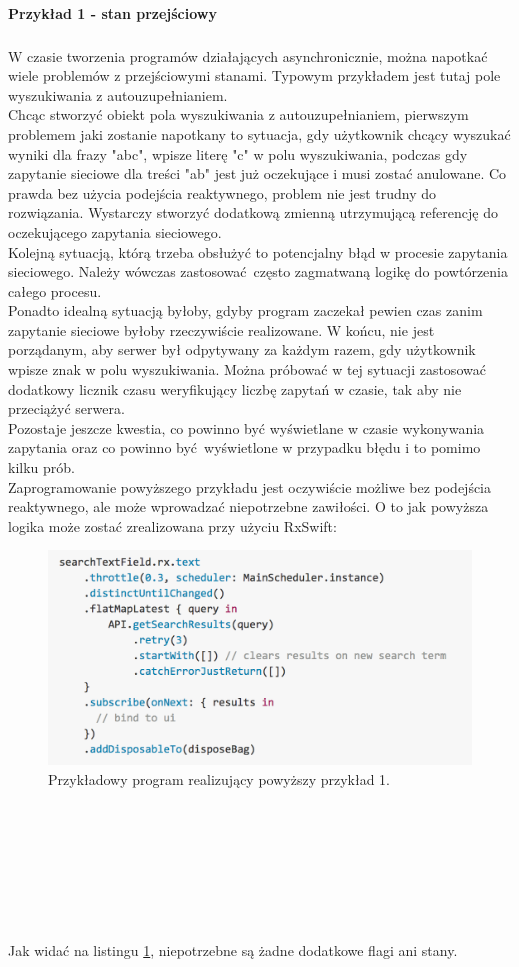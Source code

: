 \documentclass[12pt,oneside,a4paper]{report}
\begin{document}
\paragraph{Przykład 1 - stan przejściowy}
\subparagraph{}W czasie tworzenia programów działających asynchronicznie, można napotkać wiele problemów z przejściowymi stanami. Typowym przykładem jest tutaj pole wyszukiwania z autouzupełnianiem.\\
Chcąc stworzyć obiekt pola wyszukiwania z autouzupełnianiem, pierwszym problemem jaki zostanie napotkany to sytuacja, gdy użytkownik chcący wyszukać wyniki dla frazy "abc", wpisze literę "c" w polu wyszukiwania, podczas gdy zapytanie sieciowe dla treści "ab" jest już oczekujące i musi zostać anulowane. Co prawda bez użycia podejścia reaktywnego, problem nie jest trudny do rozwiązania. Wystarczy stworzyć dodatkową zmienną utrzymującą referencję do oczekującego zapytania sieciowego.\\
Kolejną sytuacją, którą trzeba obsłużyć to potencjalny błąd w procesie zapytania sieciowego. Należy wówczas zastosować często zagmatwaną logikę do powtórzenia całego procesu.\\
Ponadto idealną sytuacją byłoby, gdyby program zaczekał pewien czas zanim zapytanie sieciowe byłoby rzeczywiście realizowane. W końcu, nie jest porządanym, aby serwer był odpytywany za każdym razem, gdy użytkownik wpisze znak w polu wyszukiwania. Można próbować w tej sytuacji zastosować dodatkowy licznik czasu weryfikujący liczbę zapytań w czasie, tak aby nie przeciążyć serwera.\\
Pozostaje jeszcze kwestia, co powinno być wyświetlane w czasie wykonywania zapytania oraz co powinno być wyświetlone w przypadku błędu i to pomimo kilku prób.\\
Zaprogramowanie powyższego przykładu jest oczywiście możliwe bez podejścia reaktywnego, ale może wprowadzać niepotrzebne zawiłości.
O to jak powyższa logika może zostać zrealizowana przy użyciu RxSwift:
\begin{figure}[ht!]
	\centering
	\includegraphics[width=15cm]{transientState}
	\caption{Przykładowy program realizujący powyższy przykład 1.\cite{transientState}}
	\label{transientState}
\end{figure}
\\\\\\\\\\\\\\
Jak widać na listingu \ref{transientState}, niepotrzebne są żadne dodatkowe flagi ani stany.
\end{document}
